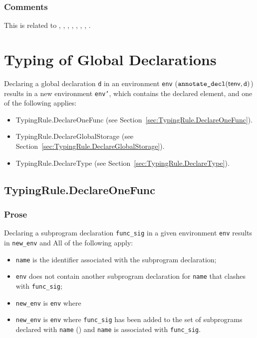 \documentclass{book}
\newcommand\declaredecl[1]{\texttt{annotate\_decl}(#1)}
\begin{document}
\subsection{Comments}
This is related to , , , ,
, , , .

\chapter{Typing of Global Declarations}

Declaring a global declaration \texttt{d} in an environment \texttt{env} ($\declaredecl{\tenv, \texttt{d}}$)
results in a new environment \texttt{env'}, which contains the declared element, and one of the following applies:
\begin{itemize}
  \item TypingRule.DeclareOneFunc (see Section~\ref{sec:TypingRule.DeclareOneFunc}).
  \item TypingRule.DeclareGlobalStorage (see Section~\ref{sec:TypingRule.DeclareGlobalStorage}).
  \item TypingRule.DeclareType (see Section~\ref{sec:TypingRule.DeclareType}).
\end{itemize}

\section{TypingRule.DeclareOneFunc \label{sec:TypingRule.DeclareOneFunc}}
\subsection{Prose}
Declaring a subprogram declaration \texttt{func\_sig} in a given environment \texttt{env} results
in \texttt{new\_env} and All of the following apply:
\begin{itemize}
  \item \texttt{name} is the identifier associated with the subprogram declaration;
  \item \texttt{env} does not contain another subprogram declaration for \texttt{name} that clashes with \texttt{func\_sig};
  \item \texttt{new\_env} is \texttt{env} where
  \item \texttt{new\_env} is \texttt{env} where
  \texttt{func\_sig} has been added to the set of subprograms declared with \texttt{name} (\subprogramrenamings)
  and \texttt{name} is associated with \texttt{func\_sig}.
\end{itemize}
\end{document}
